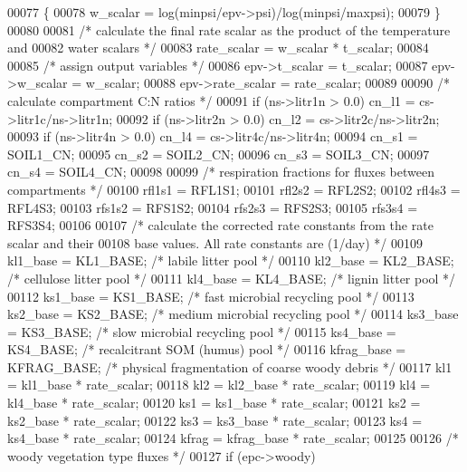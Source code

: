 \begin{DoxyCode}
00077     \{
00078         w\_scalar = log(minpsi/epv->psi)/log(minpsi/maxpsi);
00079     \}
00080     
00081     \textcolor{comment}{/* calculate the final rate scalar as the product of the temperature and}
00082 \textcolor{comment}{    water scalars */}
00083     rate\_scalar = w\_scalar * t\_scalar;
00084     
00085     \textcolor{comment}{/* assign output variables */}
00086     epv->t\_scalar = t\_scalar;
00087     epv->w\_scalar = w\_scalar;
00088     epv->rate\_scalar = rate\_scalar;
00089     
00090     \textcolor{comment}{/* calculate compartment C:N ratios */}
00091     \textcolor{keywordflow}{if} (ns->litr1n > 0.0) cn\_l1 = cs->litr1c/ns->litr1n;
00092     \textcolor{keywordflow}{if} (ns->litr2n > 0.0) cn\_l2 = cs->litr2c/ns->litr2n;
00093     \textcolor{keywordflow}{if} (ns->litr4n > 0.0) cn\_l4 = cs->litr4c/ns->litr4n;
00094     cn\_s1 = SOIL1\_CN;
00095     cn\_s2 = SOIL2\_CN;
00096     cn\_s3 = SOIL3\_CN;
00097     cn\_s4 = SOIL4\_CN;
00098     
00099     \textcolor{comment}{/* respiration fractions for fluxes between compartments */}
00100     rfl1s1 = RFL1S1;
00101     rfl2s2 = RFL2S2;
00102     rfl4s3 = RFL4S3;
00103     rfs1s2 = RFS1S2;
00104     rfs2s3 = RFS2S3;
00105     rfs3s4 = RFS3S4;
00106     
00107     \textcolor{comment}{/* calculate the corrected rate constants from the rate scalar and their}
00108 \textcolor{comment}{    base values. All rate constants are (1/day) */}
00109     kl1\_base = KL1\_BASE;    \textcolor{comment}{/* labile litter pool */}
00110     kl2\_base = KL2\_BASE;    \textcolor{comment}{/* cellulose litter pool */}
00111     kl4\_base = KL4\_BASE;    \textcolor{comment}{/* lignin litter pool */}
00112     ks1\_base = KS1\_BASE;    \textcolor{comment}{/* fast microbial recycling pool */}
00113     ks2\_base = KS2\_BASE;    \textcolor{comment}{/* medium microbial recycling pool */}
00114     ks3\_base = KS3\_BASE;    \textcolor{comment}{/* slow microbial recycling pool */}
00115     ks4\_base = KS4\_BASE;    \textcolor{comment}{/* recalcitrant SOM (humus) pool */}
00116     kfrag\_base = KFRAG\_BASE; \textcolor{comment}{/* physical fragmentation of coarse woody debris */}
00117     kl1 = kl1\_base * rate\_scalar;
00118     kl2 = kl2\_base * rate\_scalar;
00119     kl4 = kl4\_base * rate\_scalar;
00120     ks1 = ks1\_base * rate\_scalar;
00121     ks2 = ks2\_base * rate\_scalar;
00122     ks3 = ks3\_base * rate\_scalar;
00123     ks4 = ks4\_base * rate\_scalar;
00124     kfrag = kfrag\_base * rate\_scalar;
00125     
00126     \textcolor{comment}{/* woody vegetation type fluxes */}
00127     \textcolor{keywordflow}{if} (epc->woody)

\end{DoxyCode}

